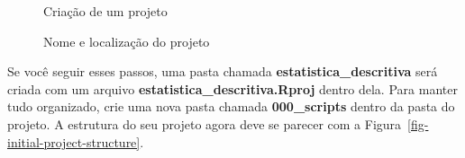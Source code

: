 \documentclass[
  letterpaper,
]{book}
\theoremstyle{definition}
\theoremstyle{plain}
\theoremstyle{remark}
\begin{document}
\begin{figure}


\caption{\label{fig-create-project}Criação de um projeto}

\end{figure}%

\begin{figure}


\caption{\label{fig-project-type-directory-name}Nome e localização do
projeto}

\end{figure}%

Se você seguir esses passos, uma pasta chamada
\textbf{estatistica\_descritiva} será criada com um arquivo
\textbf{estatistica\_descritiva.Rproj} dentro dela. Para manter tudo
organizado, crie uma nova pasta chamada \textbf{000\_scripts} dentro da
pasta do projeto. A estrutura do seu projeto agora deve se parecer com a
Figura~\ref{fig-initial-project-structure}.
\end{document}
